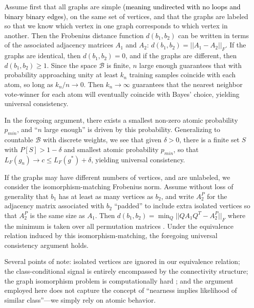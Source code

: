 \documentclass[10pt]{article}
\newcommand{\mB}{\mathcal{B}}
\providecommand{\tr}[1]{\textcolor{black}{#1}}
\begin{document}
Assume first that all graphs are simple \tr{(meaning undirected with no loops and binary binary edges)}, on the same set of vertices, and that the graphs are labeled so that we know which vertex in one graph corresponds to which vertex in another. Then the Frobenius distance function $d(b_1,b_2)$ can be written in terms of the associated adjacency matrices $A_1$ and $A_2$: $d(b_1,b_2) = ||A_1-A_2||_F$. If the graphs are identical, then $d(b_1,b_2) = 0$, and if the graphs are different, then $d(b_1,b_2) \geq 1$. Since the space $\mB$ is finite, $n$ large enough guarantees that with probability approaching unity at least $k_n$ training samples coincide with each atom, so long as $k_n/n \rightarrow 0$. Then $k_n \rightarrow \infty$ guarantees that the nearest neighbor vote-winner for each atom will eventually coincide with Bayes' choice, yielding universal consistency.

In the foregoing argument, there exists a smallest non-zero atomic probability $p_{min}$, and ``$n$ large enough'' is driven by this probability. Generalizing to countable $\mB$ with discrete weights, we see that given $\delta > 0$, there is a finite set $S$ with $P[S]>1-\delta$ and smallest atomic probability $p_{min}$, so that $L_{F}(g_n) \rightarrow c \leq L_{F}(g^*) + \delta$, yielding universal consistency.

If the graphs may have different numbers of vertices, and are unlabeled, we consider the isomorphism-matching Frobenius norm. Assume without loss of generality that $b_1$ has at least as many vertices as $b_2$, and write $A_2^P$ for the adjacency matrix associated with $b_2$ ``padded'' to include extra isolated vertices so that $A_2^P$ is the same size as $A_1$. Then $d(b_1,b_2) = \min_Q ||Q A_1 Q^T - A_2^P||_F$ where the minimum is taken over all permutation matrices \cite{HornJohnson90}. Under the equivalence relation induced by this isomorphism-matching, the foregoing universal consistency argument holds.

Several points of note:  isolated vertices are ignored in our equivalence relation; the class-conditional signal is entirely encompassed by the connectivity structure; the graph isomorphism problem is computationally hard \cite{ConroyLouis97,ZaslavskiyVert08}; and the argument employed here does not capture the concept of ``nearness implies likelihood of similar class''---we simply rely on atomic behavior.
\end{document}
